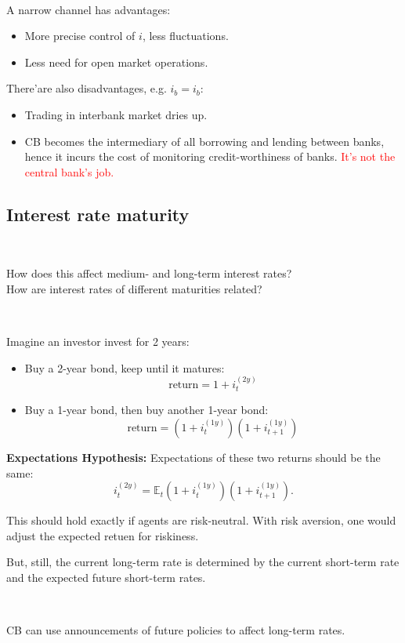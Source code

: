 \begin{note}
    \ 

    A narrow channel has advantages:
    \begin{itemize}
        \item More precise control of $i$, less fluctuations.
        \item Less need for open market operations.
    \end{itemize}

    There'are also disadvantages, e.g. $i_b = i_b$:
    \begin{itemize}
        \item Trading in interbank market dries up.
        \item CB becomes the intermediary of all borrowing and lending between banks, hence it incurs the cost of monitoring credit-worthiness of banks. \textcolor{red}{It's not the central bank's job.}
    \end{itemize}
\end{note}

\subsection{Interest rate maturity}

\begin{question}
    \

    How does this affect medium- and long-term interest rates? \\
    How are interest rates of different maturities related?
\end{question}

\begin{eg}
    \ 

    Imagine an investor invest for 2 years:
    \begin{itemize}
        \item Buy a 2-year bond, keep until it matures: \[\text{return} = 1 + i_t^{(2y)}\]
        \item Buy a 1-year bond, then buy another 1-year bond: \[\text{return} = (1+i_t^{(1y)})(1+i_{t+1}^{(1y)})\]    
    \end{itemize}

    \textbf{Expectations Hypothesis:} Expectations of these two returns should be the same:
    \[i_t^{(2y)} = \mathbb{E}_t (1 + i_t^{(1y)})(1 + i_{t+1}^{(1y)}).\]

    This should hold exactly if agents are risk-neutral. With risk aversion, one would adjust the expected retuen for riskiness.

    But, still, the current long-term rate is determined by the current short-term rate and the expected future short-term rates.
    \begin{note}
        \ 

        CB can use announcements of future policies to affect long-term rates.
    \end{note}
\end{eg}
